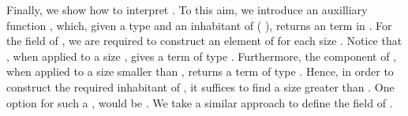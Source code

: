 
Finally, we show how to interpret . To this aim, we
introduce an auxilliary function , which, given a type
 and an inhabitant  of ( ), returns an
term in  .  For the field  of 
 , we are required to construct an element of 
  for each size .
Notice that  , when applied to a size
, gives a term  of type   . Furthermore, the
component  of , when applied to a size  smaller
than , returns a term of type   .
Hence, in order to construct the required inhabitant of   , it suffices to find a size  greater than .
One option for such a , would be . We take a similar approach to define the field  of .

